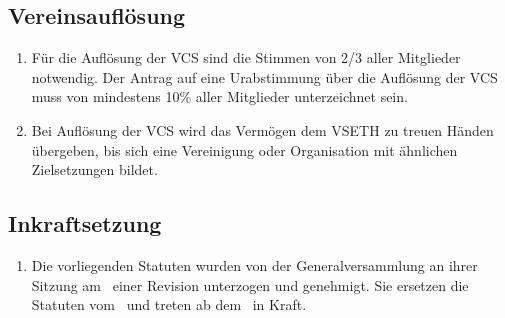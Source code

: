 \addtocounter{article}{-2} %

\subsection{Vereinsauflösung}
\label{sec:vereinsAufloesung}
\begin{enumerate}
\item Für die Auflösung der VCS sind die Stimmen von 2/3 aller Mitglieder notwendig. Der Antrag auf eine Urabstimmung über die Auflösung der VCS muss von mindestens 10\% aller Mitglieder unterzeichnet sein.
\item Bei Auflösung der VCS wird das Vermögen dem VSETH zu treuen Händen übergeben, bis sich eine Vereinigung oder Organisation mit ähnlichen Zielsetzungen bildet.
\end{enumerate}

\subsection{Inkraftsetzung}
\begin{enumerate}
\item Die vorliegenden Statuten wurden von der Generalversammlung an ihrer Sitzung am \thedate \ einer Revision unterzogen und genehmigt. Sie ersetzen die Statuten vom \theolddate \ und treten ab dem \thedateplus \ in Kraft.
\end{enumerate}
